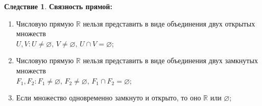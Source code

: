 \documentclass[12pt]{article}
\theoremstyle{definition}
\newtheorem{corollary}{Следствие}
\begin{document}
	
\begin{corollary}\textbf{Связность прямой:} \hfill
	\begin{enumerate}[label={\arabic*)}]
		\item Числовую прямую $\mathbb{R}$ нельзя представить в виде объединения двух открытых множеств \\
		$U, V \colon U \neq \varnothing, \, V \neq \varnothing, \, U \cap V = \varnothing$;
		\item Числовую прямую $\mathbb{R}$ нельзя представить в виде объединения двух замкнутых множеств \\
		$F_1, F_2 \colon F_1  \neq \varnothing, \, F_2  \neq \varnothing, \, F_1 \cap F_2 = \varnothing$;
		\item 	Если множество одновременно замкнуто и открыто, то оно $\mathbb{R}$ или $\varnothing$;
	\end{enumerate}
\end{corollary}
\end{document}
